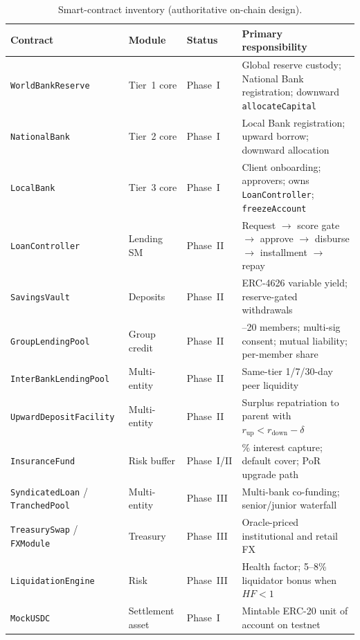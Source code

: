 \documentclass[11pt,a4paper]{article}
\newcommand{\tablehead}{\rowcolor{HeadShade}\bfseries}
\begin{document}
\begin{table}[H]
\centering
\footnotesize
\caption{Smart-contract inventory (authoritative on-chain design).}
\label{tab:contracts}
\begin{tabular}{@{}>{\raggedright\arraybackslash}p{3.15cm}>{\raggedright\arraybackslash}p{2.35cm}>{\raggedright\arraybackslash}p{1.55cm}>{\raggedright\arraybackslash}p{6.7cm}@{}}
\toprule
\tablehead Contract & Module & Status & Primary responsibility \\
\midrule
\texttt{WorldBankReserve} & Tier~1 core & Phase~I & Global reserve custody; National Bank registration; downward \texttt{allocateCapital} \\
\rowcolor{RowShade}
\texttt{NationalBank} & Tier~2 core & Phase~I & Local Bank registration; upward borrow; downward allocation \\
\texttt{LocalBank} & Tier~3 core & Phase~I & Client onboarding; approvers; owns \texttt{LoanController}; \texttt{freezeAccount} \\
\rowcolor{RowShade}
\texttt{LoanController} & Lending SM & Phase~II & Request $\to$ score gate $\to$ approve $\to$ disburse $\to$ installment $\to$ repay \\
\texttt{SavingsVault} & Deposits & Phase~II & ERC-4626 variable yield; reserve-gated withdrawals \\
\rowcolor{RowShade}
\texttt{GroupLendingPool} & Group credit & Phase~II & 3--20 members; multi-sig consent; mutual liability; per-member share \\
\texttt{InterBankLendingPool} & Multi-entity & Phase~II & Same-tier 1/7/30-day peer liquidity \\
\rowcolor{RowShade}
\texttt{UpwardDepositFacility} & Multi-entity & Phase~II & Surplus repatriation to parent with $r_{\mathrm{up}}<r_{\mathrm{down}}-\delta$ \\
\texttt{InsuranceFund} & Risk buffer & Phase~I/II & 5\% interest capture; default cover; PoR upgrade path \\
\rowcolor{RowShade}
\texttt{SyndicatedLoan} / \texttt{TranchedPool} & Multi-entity & Phase~III & Multi-bank co-funding; senior/junior waterfall \\
\texttt{TreasurySwap} / \texttt{FXModule} & Treasury & Phase~III & Oracle-priced institutional and retail FX \\
\rowcolor{RowShade}
\texttt{LiquidationEngine} & Risk & Phase~III & Health factor; 5--8\% liquidator bonus when $HF<1$ \\
\texttt{MockUSDC} & Settlement asset & Phase~I & Mintable ERC-20 unit of account on testnet \\
\bottomrule
\end{tabular}
\end{table}
\end{document}
